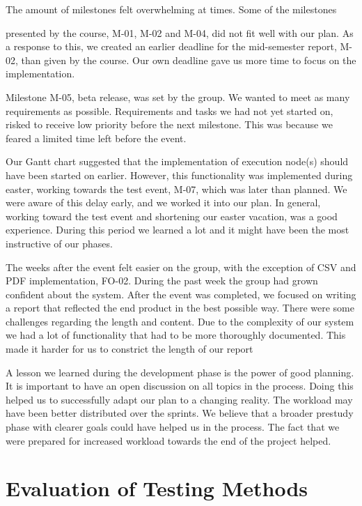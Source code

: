 The amount of milestones felt overwhelming at times. Some of the
milestones 

presented by the course, M-01, M-02 and M-04, did not fit well with our
plan. As a response to this, we created an earlier deadline for the
mid-semester report, M-02, than given by the course. Our own deadline
gave us more time to focus on the implementation. 

Milestone M-05, beta release, was set by the group. We wanted to meet as
many requirements as possible. Requirements and tasks we had not yet
started on, risked to receive low priority before the next milestone.
This was because we feared a limited time left before the event.

Our Gantt chart suggested that the implementation of execution node(s)
should have been started on earlier. However, this functionality was
implemented during easter, working towards the test event, M-07, which
was later than planned. We were aware of this delay early, and we
worked it into our plan. In general, working toward the test event and
shortening our easter vacation, was a good experience. During this
period we learned a lot and it might have been the most instructive of
our phases. 

The weeks after the event felt easier on the group, with the exception
of CSV and PDF implementation, FO-02. During the past week the group
had grown confident about the system. After the event was completed, we
focused on writing a report that reflected the end product in the best
possible way. There were some challenges regarding the length and
content. Due to the complexity of our system we had a lot of
functionality that had to be more thoroughly documented. This made it
harder for us to constrict the length of our report

A lesson we learned during the development phase is the power of good
planning. It is important to have an open discussion on all topics in
the process. Doing this helped us to successfully adapt our plan to a
changing reality. The workload may have been better distributed over
the sprints. We believe that a broader prestudy phase with clearer
goals could have helped us in the process. The fact that we were
prepared for increased workload towards the end of the project helped.

\section{Evaluation of Testing Methods}


